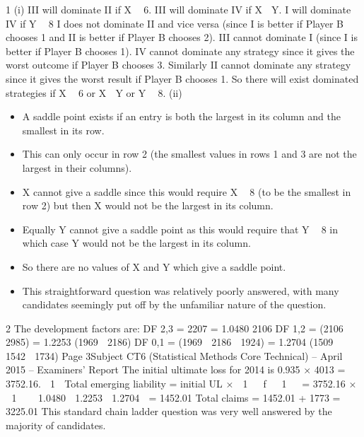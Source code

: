 \documentclass[a4paper,12pt]{article}
\begin{document}
1
(i)
III will dominate II if X  6.
III will dominate IV if X  Y.
I will dominate IV if Y  8
I does not dominate II and vice versa (since I is better if Player B chooses 1
and II is better if Player B chooses 2).
III cannot dominate I (since I is better if Player B chooses 1).
IV cannot dominate any strategy since it gives the worst outcome if Player B
chooses 3.
Similarly II cannot dominate any strategy since it gives the worst result if
Player B chooses 1.
So there will exist dominated strategies if X  6 or X  Y or Y  8.
(ii)
\begin{itemize}
\item A saddle point exists if an entry is both the largest in its column and the
smallest in its row.
\item This can only occur in row 2 (the smallest values in rows 1 and 3 are not the
largest in their columns).
\item X cannot give a saddle since this would require X  8 (to be the smallest in
row 2) but then X would not be the largest in its column.
\item Equally Y cannot give a saddle point as this would require that Y  8 in which
case Y would not be the largest in its column.
\item 
So there are no values of X and Y which give a saddle point.
\item 
This straightforward question was relatively poorly answered, with many candidates
seemingly put off by the unfamiliar nature of the question.
\end{itemize}
2
The development factors are:
DF 2,3 = 2207
= 1.0480
2106
DF 1,2 = (2106  2985)
= 1.2253
(1969  2186)
DF 0,1 = (1969  2186  1924)
= 1.2704
(1509  1542  1734)
Page 3Subject CT6 (Statistical Methods Core Technical) – April 2015 – Examiners’ Report
The initial ultimate loss for 2014 is 0.935 × 4013 = 3752.16.
 1 
Total emerging liability = initial UL ×  1  
f 

1


= 3752.16 ×  1 

 1.0480  1.2253  1.2704 
= 1452.01
Total claims = 1452.01 + 1773
= 3225.01
This standard chain ladder question was very well answered by the majority of candidates.
\end{document}

